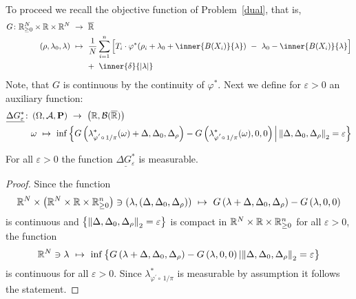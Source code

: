 To proceed we recall the objective function of Problem~\ref{dual}, that is,
\begin{align*}
  G\colon
  \R^N_{\ge 0}
  \times
  \R
  \times
  \R^{N}
  &
  \ 
  \to
  \ 
  \overline{\R}
  \\
  \left( 
    \rho
    ,
    \lambda_0,
    \lambda
  \right)
  &
  \ 
  \mapsto
  \ 
    \frac{1}{N}
\sum_{i=1} 
  ^n
  \Big[
  T_i
  \cdot
  \varphi^*
  \!
  \left( 
    \rho_i
    +
\lambda_0
+
\inner
{B(X_i)}
{
\lambda
}
  \right)
  \ 
  -
  \ 
\lambda_0
-
\inner
{B(X_i)}
{
\lambda
}
\Big]
  \\
  &
  \qquad 
+
\ 
\inner
{\delta}
{
  |\lambda|
}
\end{align*}
Note, that $G$ is continuous by the continuity of $\varphi^*$.
Next we define for $\varepsilon>0$ an auxiliary function:
   \begin{align*}
     \underline{
     \Delta G^*
     _\varepsilon
     }
     \colon
     &
     \left( \Omega,\mathcal{A},\P \right)
     \ 
     \to
     \ 
     \left( 
       \R,\mathcal{B}(\overline{\R})
     \right)
     \\
     &
     \omega
     \ 
     \mapsto
     \ 
   \inf
   \left\{ 
 G
   \left( 
\lambda^*_{\varphi^{'}\circ\,1/\pi}
(\omega)
+\Delta
,
\Delta_0
,
\Delta_\rho
   \right)
   -
   G
   \left(
\lambda^*_{\varphi^{'}\circ\,1/\pi}
(\omega)
,0,0
   \right)
   \Big\lvert
   \norm{
\Delta
,
\Delta_0
,
\Delta_\rho
   }_2
   =\varepsilon
   \right\}
   \end{align*}
\begin{lemma}
  \label{G_meas}
  For all $\varepsilon>0$ the function
  $
     \underline{
     \Delta G^*
     _\varepsilon
     }
  $
  is measurable.
\end{lemma}
\begin{proof}
  Since the function
  \begin{align*}
    \R^{N}
    \times
    \left( 
    \R^{N}
    \times
    \R
    \times
    \R^n_{\ge 0}
    \right)
    \ni
    \left( 
    \lambda,(\Delta,\Delta_0,\Delta_\rho)
    \right)
    \ 
    \mapsto
    \ 
 G
   \left( 
     \lambda
+\Delta
,
\Delta_0
,
\Delta_\rho
   \right)
   -
   G
   \left(
     \lambda
,0,0
   \right)
  \end{align*}
  is continuous and 
  $
  \left\{
   \left\lVert
\Delta
,
\Delta_0
,
\Delta_\rho
   \right\rVert_2
   =\varepsilon
  \right\}
  $
  is compact in 
  $
    \mathbb{R}^{N}
    \times
    \mathbb{R}
    \times
    \mathbb{R}^n_{\ge 0}
    $
    for all $\varepsilon>0$,
  the function
\begin{align*}
    \R^{N}
    \ni
    \lambda
    \ 
    \mapsto
    \ 
    \inf
    \left\{ 
  G
   \left( 
     \lambda
+\Delta
,
\Delta_0
,
\Delta_\rho
   \right)
   -
   G
   \left(
     \lambda
,0,0
   \right)
   \lvert
   \norm{
\Delta
,
\Delta_0
,
\Delta_\rho
   }_2
   =\varepsilon
    \right\}
   \end{align*}
is continuous for all $\varepsilon>0$.
Since 
$
\lambda^*_{\varphi^{'}\circ\,1/\pi}
$
is measurable by assumption it follows the statement.
\end{proof}

